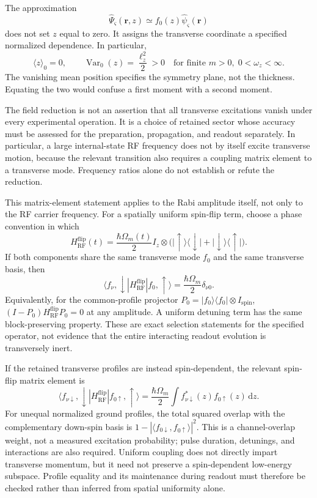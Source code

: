 \documentclass[11pt,a4paper]{article}
\theoremstyle{definition}
\theoremstyle{remark}
\newcommand{\dd}{\mathrm{d}}
\newcommand{\Var}{\operatorname{Var}}
\newcommand{\lop}{\ell_z}
\begin{document}
The approximation
\begin{equation}
 \widehat\Psi_{\varsigma}(\boldsymbol r,z)
 \simeq f_0(z)\widehat\psi_{\varsigma}(\boldsymbol r)
 \label{eq:factorization}
\end{equation}
does not set $z$ equal to zero. It assigns the transverse coordinate a specified normalized dependence. In particular,
\begin{equation}
 \langle z\rangle_0=0,\qquad
 \Var_0(z)=\frac{\lop^2}{2}>0
 \quad\text{for finite }m>0,\;0<\omega_z<\infty.
 \label{eq:width}
\end{equation}
The vanishing mean position specifies the symmetry plane, not the thickness. Equating the two would confuse a first moment with a second moment.

The field reduction is not an assertion that all transverse excitations vanish under every experimental operation. It is a choice of retained sector whose accuracy must be assessed for the preparation, propagation, and readout separately. In particular, a large internal-state RF frequency does not by itself excite transverse motion, because the relevant transition also requires a coupling matrix element to a transverse mode. Frequency ratios alone do not establish or refute the reduction.\cite{zhang2026,precursor}

This matrix-element statement applies to the Rabi amplitude itself, not only to the RF carrier frequency. For a spatially uniform spin-flip term, choose a phase convention in which
\[
 H_{\mathrm{RF}}^{\mathrm{flip}}(t)
 =\frac{\hbar\Omega_m(t)}{2}I_z\otimes
 \bigl(\lvert\uparrow\rangle\langle\downarrow\rvert
       +\lvert\downarrow\rangle\langle\uparrow\rvert\bigr).
\]
If both components share the same transverse mode $f_0$ and the same transverse basis, then
\[
 \langle f_\nu,\downarrow|H_{\mathrm{RF}}^{\mathrm{flip}}
          |f_0,\uparrow\rangle
 =\frac{\hbar\Omega_m}{2}\delta_{\nu0}.
\]
Equivalently, for the common-profile projector
$P_0=|f_0\rangle\langle f_0|\otimes I_{\mathrm{spin}}$,
$(I-P_0)H_{\mathrm{RF}}^{\mathrm{flip}}P_0=0$ at any amplitude. A uniform detuning term has the same block-preserving property. These are exact selection statements for the specified operator, not evidence that the entire interacting readout evolution is transversely inert.\cite{zhang2026,precursor}

If the retained transverse profiles are instead spin-dependent, the relevant spin-flip matrix element is
\[
 \langle f_{\nu\downarrow},\downarrow|
 H_{\mathrm{RF}}^{\mathrm{flip}}|f_{0\uparrow},\uparrow\rangle
 =\frac{\hbar\Omega_m}{2}
   \int f_{\nu\downarrow}^*(z)f_{0\uparrow}(z)\,\dd z.
\]
For unequal normalized ground profiles, the total squared overlap with the complementary down-spin basis is
$1-|\langle f_{0\downarrow},f_{0\uparrow}\rangle|^2$.
This is a channel-overlap weight, not a measured excitation probability; pulse duration, detunings, and interactions are also required. Uniform coupling does not directly impart transverse momentum, but it need not preserve a spin-dependent low-energy subspace. Profile equality and its maintenance during readout must therefore be checked rather than inferred from spatial uniformity alone.\cite{zhang2026,precursor}
\end{document}

